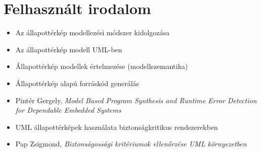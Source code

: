 %

\section*{Felhasznált irodalom}

\begin{itemize}
	\item Az állapottérkép modellezési módszer kidolgozása~\cite{DBLP:journals/scp/Harel87, DBLP:conf/hopl/Harel07}
	\item Az állapottérkép modell UML-ben~\cite{UML}
	\item Állapottérkép modellek értelmezése (modellszemantika)~\cite{DBLP:conf/fmoods/LatellaMM99, DBLP:conf/acsd/DubrovinJ08, DBLP:conf/lics/HarelPSS87}
	\item Állapottérkép alapú forráskód generálás~\cite{samak2008practical}
	\item Pintér Gergely, \emph{Model Based Program Synthesis and Runtime Error Detection for Dependable Embedded Systems}~\cite{PinterGergelyPhD}
	\item UML állapottérképek használata biztonságkritikus rendszerekben~\cite{knight1997formal, DBLP:conf/icre/NobeW96}
	\item Pap Zsigmond, \emph{Biztonságossági kritériumok ellenőrzése UML környezetben}~\cite{PapZsigmondPhD}
\end{itemize}

\begin{fektetett}
\end{fektetett}
